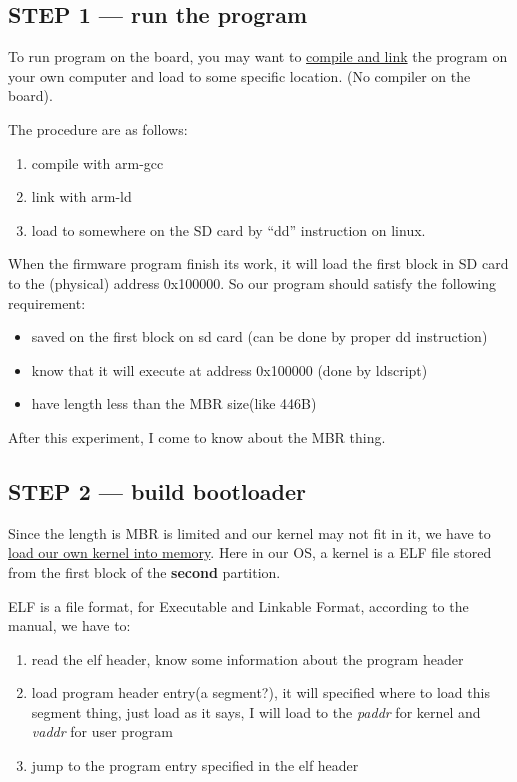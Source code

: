 \documentclass{article}
\begin{document}
\subsection{STEP 1 --- run the program}

To run program on the board, you may want to \underline{compile and link} the program on your own computer and load to some specific location. (No compiler on the board).

The procedure are as follows:

\begin{enumerate}
	\item	compile with arm-gcc
	\item	link with arm-ld
	\item	load to somewhere on the SD card by ``dd'' instruction on linux.
\end{enumerate}

When the firmware program finish its work, it will load the first block in SD card to the (physical) address 0x100000. So our program should satisfy the following requirement:

\begin{itemize}
	\item	saved on the first block on sd card (can be done by proper dd instruction)
	\item	know that it will execute at address 0x100000 (done by ldscript)
	\item have length less than the MBR size(like 446B)
\end{itemize}

After this experiment, I come to know about the MBR thing.

\subsection{STEP 2 --- build bootloader}

Since the length is MBR is limited and our kernel may not fit in it, we have to \underline{load our own kernel into memory}. Here in our OS, a kernel is a ELF file stored from the first block of the \textbf{second} partition.

ELF is a file format, for Executable and Linkable Format, according to the manual, we have to:
\begin{enumerate}
	\item	read the elf header, know some information about the program header
	\item	load program header entry(a segment?), it will specified where to load this segment thing, just load as it says, I will load to the \emph{paddr} for kernel and \emph{vaddr} for user program
	\item	jump to the program entry specified in the elf header
\end{enumerate}
\end{document}
